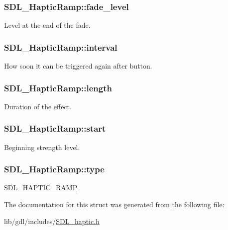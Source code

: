 \subsubsection[{fade\+\_\+level}]{ S\+D\+L\+\_\+\+Haptic\+Ramp\+::fade\+\_\+level}\label{struct_s_d_l___haptic_ramp_a66b586f2e6a23a085a7b2854f61752c5}
Level at the end of the fade. \hypertarget{struct_s_d_l___haptic_ramp_a4b89d108cfa7e96ea58b58771334c33d}{}
\subsubsection[{interval}]{ S\+D\+L\+\_\+\+Haptic\+Ramp\+::interval}\label{struct_s_d_l___haptic_ramp_a4b89d108cfa7e96ea58b58771334c33d}
How soon it can be triggered again after button. \hypertarget{struct_s_d_l___haptic_ramp_a57e75237507701405af2a3caf34cdb5a}{}
\subsubsection[{length}]{ S\+D\+L\+\_\+\+Haptic\+Ramp\+::length}\label{struct_s_d_l___haptic_ramp_a57e75237507701405af2a3caf34cdb5a}
Duration of the effect. \hypertarget{struct_s_d_l___haptic_ramp_acc0e813ac6399290fd4a788d2471e8d4}{}
\subsubsection[{start}]{ S\+D\+L\+\_\+\+Haptic\+Ramp\+::start}\label{struct_s_d_l___haptic_ramp_acc0e813ac6399290fd4a788d2471e8d4}
Beginning strength level. \hypertarget{struct_s_d_l___haptic_ramp_aca1c2349372433822ab62f60976640aa}{}
\subsubsection[{type}]{ S\+D\+L\+\_\+\+Haptic\+Ramp\+::type}\label{struct_s_d_l___haptic_ramp_aca1c2349372433822ab62f60976640aa}
\hyperlink{_s_d_l__haptic_8h_af10eb937a64a8f602e9c46682ac0d868}{S\+D\+L\+\_\+\+H\+A\+P\+T\+I\+C\+\_\+\+R\+A\+M\+P} 

The documentation for this struct was generated from the following file\+:\begin{DoxyCompactItemize}
\item 
lib/gdl/includes/\hyperlink{_s_d_l__haptic_8h}{S\+D\+L\+\_\+haptic.\+h}\end{DoxyCompactItemize}
